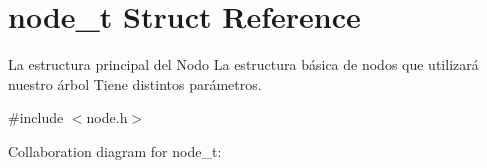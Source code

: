 \hypertarget{structnode__t}{}\section{node\+\_\+t Struct Reference}
\label{structnode__t}


La estructura principal del Nodo La estructura básica de nodos que utilizará nuestro árbol Tiene distintos parámetros.  




{\ttfamily \#include $<$node.\+h$>$}



Collaboration diagram for node\+\_\+t\+:
